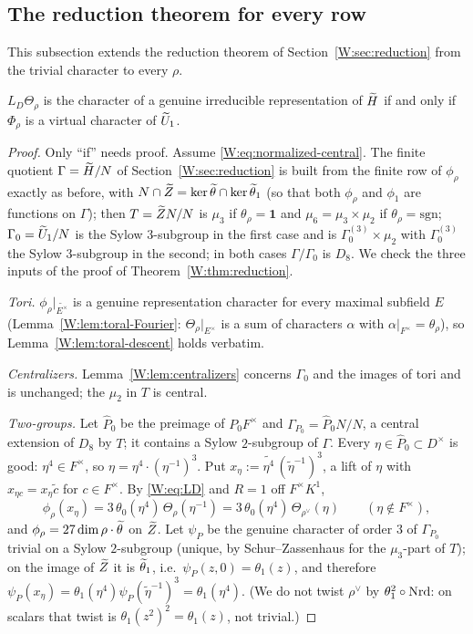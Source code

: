 \subsection{The reduction theorem for every row}
This subsection extends the reduction theorem of Section~\ref{W:sec:reduction} from the trivial character to every $\rho$.

\begin{theorem}\label{W:thm:reduction-all}
$L_D\Theta_\rho$ is the character of a genuine irreducible representation
of $\widetilde H$ if and only if $\Phi_\rho$ is a virtual character of $\widetilde U_1$.
\end{theorem}
\begin{proof}
Only ``if'' needs proof.  Assume \eqref{W:eq:normalized-central}.  The
finite quotient $\Gamma=\widetilde H/N$ of Section~\ref{W:sec:reduction} is built
from the finite row of $\phi_\rho$ exactly as before, with
$N\cap\widetilde Z=\ker\widetilde\theta\cap\ker\widetilde\theta_1$ (so that both $\phi_\rho$ and $\phi_1$
are functions on $\Gamma$); then $T=\widetilde Z N/N$ is $\mu_3$ if
$\theta_\rho=\mathbf1$ and $\mu_6=\mu_3\times\mu_2$ if
$\theta_\rho=\mathrm{sgn}$; $\Gamma_0=\widetilde U_1/N$ is the Sylow
$3$-subgroup in the first case and is $\Gamma_0^{(3)}\times\mu_2$ with
$\Gamma_0^{(3)}$ the Sylow $3$-subgroup in the second; in both cases
$\Gamma/\Gamma_0$ is $D_8$.  We check the three inputs of the proof
of Theorem~\ref{W:thm:reduction}.

\emph{Tori.}  $\phi_\rho|_{\widetilde{E^\times}}$ is a genuine
representation character for every maximal subfield $E$
(Lemma~\ref{W:lem:toral-Fourier}: $\Theta_\rho|_{E^\times}$ is a sum of
characters $\alpha$ with $\alpha|_{F^\times}=\theta_\rho$), so
Lemma~\ref{W:lem:toral-descent} holds verbatim.

\emph{Centralizers.}  Lemma~\ref{W:lem:centralizers} concerns $\Gamma_0$
and the images of tori and is unchanged; the $\mu_2$ in $T$ is central.

\emph{Two-groups.}  Let $\hat P_0$ be the preimage of $P_0F^\times$ and
$\Gamma_{P_0}=\hat P_0N/N$, a central extension of $D_8$ by $T$; it
contains a Sylow $2$-subgroup of $\Gamma$.  Every $\eta\in\hat P_0\subset D^\times$
is good: $\eta^4\in F^\times$, so $\eta=\eta^4\cdot(\eta^{-1})^3$.  Put
$x_\eta:=\widetilde{\eta^4}\,(\tilde\eta^{-1})^3$, a lift of $\eta$ with
$x_{\eta c}=x_\eta\tilde c$ for $c\in F^\times$.  By \eqref{W:eq:LD} and $R=1$
off $F^\times K^1$,
\[
 \phi_\rho(x_\eta)=3\,\theta_0(\eta^4)\,\Theta_\rho(\eta^{-1})
 =3\,\theta_0(\eta^4)\,\Theta_{\rho^\vee}(\eta)\qquad(\eta\notin F^\times),
\]
and $\phi_\rho=27\dim\rho\cdot\widetilde\theta$ on $\widetilde Z$.  Let $\psi_P$ be the
genuine character of order $3$ of $\Gamma_{P_0}$ trivial on a Sylow
$2$-subgroup (unique, by Schur--Zassenhaus for the $\mu_3$-part of $T$);
on the image of $\widetilde Z$ it is $\widetilde\theta_1$, i.e.\ $\psi_P(z,0)=\theta_1(z)$, and
therefore $\psi_P(x_\eta)=\theta_1(\eta^4)\psi_P(\tilde\eta^{-1})^3=\theta_1(\eta^4)$.
(We do not twist $\rho^\vee$ by $\theta_1^2\circ\operatorname{Nrd}$: on scalars that
twist is $\theta_1(z^2)^2=\theta_1(z)$, not trivial.)


\end{proof}
